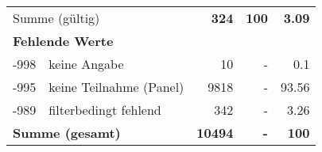 \begin{longtable}{lXrrr}
     \midrule
     \multicolumn{2}{l}{Summe (gültig)} &
       \textbf{\num{324}} &
     \textbf{100} &
       \textbf{\num[round-mode=places,round-precision=2]{3,09}} \\
     \multicolumn{5}{l}{\textbf{Fehlende Werte}}\\
       -998 &
       keine Angabe &
         \num{10} &
        - &
         \num[round-mode=places,round-precision=2]{0,1} \\
       -995 &
       keine Teilnahme (Panel) &
         \num{9818} &
        - &
         \num[round-mode=places,round-precision=2]{93,56} \\
       -989 &
       filterbedingt fehlend &
         \num{342} &
        - &
         \num[round-mode=places,round-precision=2]{3,26} \\
     \midrule
     \multicolumn{2}{l}{\textbf{Summe (gesamt)}} &
          \textbf{\num{10494}} &
        \textbf{-} &
        \textbf{100} \\
     \bottomrule
     \end{longtable}
     
